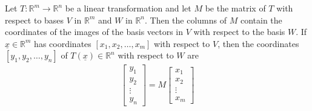 \documentclass[a4paper]{article}
\theoremstyle{plain}
\newtheorem*{cor}{Corollary}
\theoremstyle{definition}
\theoremstyle{remark}
\begin{document}
\begin{tcolorbox}[colback=black!3!white,colframe=black!60!white,title=\begin{cor}M matrix of bases \label{M matrix of bases}\end{cor}]
        Let $T : \mathbb{R}^{m} \to \mathbb{R}^{n}$ be a linear transformation and let $M$ be the matrix of $T$ with respect to bases $V$ in $\mathbb{R}^{m} $ and $W$ in $\mathbb{R}^{n}$. Then the columns of $M$ contain the coordinates of the images of the basis vectors in $V$ with respect to the basis $W$. If $\underline{x} \in \mathbb{R}^{m}$ has coordinates $[x_1,x_2,\ldots,x_m]$ with respect to $V$, then the coordinates $[y_1,y_2,\ldots,y_n]$ of $T(\underline{x}) \in \mathbb{R}^{n}$ with respect to $W$ are 
                \begin{align}
                \begin{bmatrix} y_1 \\ y_2 \\ \vdots \\ y_n \end{bmatrix} = M \begin{bmatrix} x_1 \\ x_2 \\ \vdots \\ x_m \end{bmatrix} 
                \end{align}
\end{tcolorbox}
\end{document}
